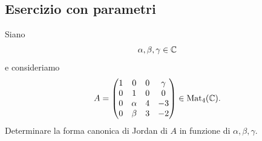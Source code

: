 \documentclass[a4paper]{article}
\begin{document}
\subsection{Esercizio con parametri}

\begin{radioactive}
\begin{snippetexercise}{}
    Siano
    \[
        \alpha,\beta,\gamma\in\mathbb{C}
    \]
    e consideriamo
    \[
        A=
        \begin{pmatrix}
            1 & 0 & 0 & \gamma\\
            0 & 1 & 0 & 0\\
            0 & \alpha & 4 & -3\\
            0 & \beta & 3 & -2
        \end{pmatrix}
        \in\operatorname{Mat}_4(\mathbb{C}).
    \]
    Determinare la forma canonica di Jordan di \(A\) in funzione di \(\alpha,\beta,\gamma\).
\end{snippetexercise}
\end{radioactive}
\end{document}
